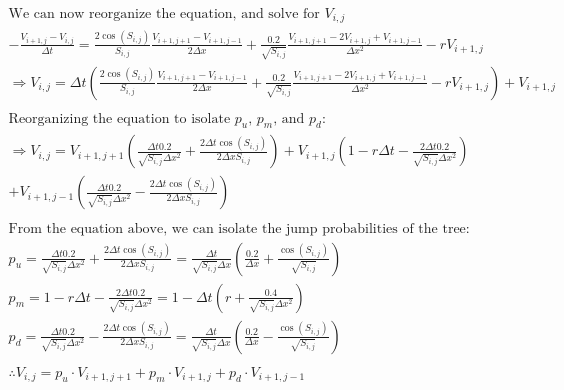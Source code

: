 \documentclass[10pt]{article}
\begin{document}
\newpage
\begin{gather*}
    \text{We can now reorganize the equation, and solve for $V_{i, j}$} \\
    - \frac{V_{i+1, j} - V_{i, j}}{\Delta t} = \frac{2\cos{(S_{i, j})}}{S_{i,j}} \frac{V_{i+1,j+1} - V_{i+1, j-1}}{2 \Delta x} + \frac{0.2}{\sqrt{S_{i, j}}} \frac{V_{i+1, j+1} - 2V_{i+1, j} + V_{i+1, j-1}}{\Delta x^2} - rV_{i+1, j} \\
    \Rightarrow V_{i, j} = \Delta t \left( \frac{2\cos{(S_{i, j})}}{S_{i,j}} \frac{V_{i+1,j+1} - V_{i+1, j-1}}{2 \Delta x} + \frac{0.2}{\sqrt{S_{i, j}}} \frac{V_{i+1, j+1} - 2V_{i+1, j} + V_{i+1, j-1}}{\Delta x^2} - rV_{i+1, j} \right) + V_{i+1, j} \\
    \\
    \text{Reorganizing the equation to isolate $p_u$, $p_m$, and $p_d$:} \\
    \Rightarrow V_{i, j} = V_{i+1,j+1}\left( \frac{\Delta t 0.2}{\sqrt{S_{i,j}} \Delta x^2} + \frac{2 \Delta t \cos{(S_{i,j})}}{2\Delta x S_{i,j}} \right) + V_{i+1,j} \left( 1 - r \Delta t - \frac{2\Delta t 0.2}{\sqrt{S_{i,j}} \Delta x^2} \right) \\
    + V_{i+1,j-1} \left( \frac{\Delta t 0.2}{\sqrt{S_{i,j}} \Delta x^2} - \frac{2\Delta t \cos{(S_{i,j})}}{2\Delta x S_{i,j}} \right) \\
    \\
    \text{From the equation above, we can isolate the jump probabilities of the tree:} \\
    p_u
        = \frac{\Delta t 0.2}{\sqrt{S_{i,j}} \Delta x^2} + \frac{2 \Delta t \cos{(S_{i,j})}}{2\Delta x S_{i,j}}
        = \frac{\Delta t}{\sqrt{S_{i,j}} \Delta x} \left( \frac{0.2}{\Delta x} + \frac{\cos{(S_{i,j})}}{\sqrt{S_{i,j}}} \right) \\
    p_m
        = 1 - r \Delta t - \frac{2\Delta t 0.2}{\sqrt{S_{i,j}} \Delta x^2}
        = 1 - \Delta t \left( r + \frac{0.4}{\sqrt{S_{i,j}} \Delta x^2} \right) \\
    p_d
        = \frac{\Delta t 0.2}{\sqrt{S_{i,j}} \Delta x^2} - \frac{2\Delta t \cos{(S_{i,j})}}{2\Delta x S_{i,j}}
        = \frac{\Delta t}{\sqrt{S_{i,j}} \Delta x} \left( \frac{0.2}{\Delta x} - \frac{\cos{(S_{i,j})}}{\sqrt{S_{i,j}}} \right) \\
    \\
    \therefore V_{i,j} = p_u \cdot V_{i+1,j+1} + p_m \cdot V_{i+1,j} + p_d \cdot V_{i+1,j-1}
\end{gather*}

\end{document}
